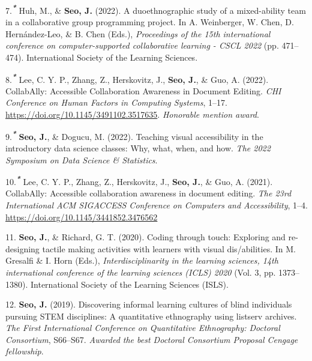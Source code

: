 \documentclass[11pt,a4paper,]{awesome-cv}
\newlength{\cslhangindent}
\newenvironment{CSLReferences}[2] %
 {\begin{list}{}{%
  \setlength{\itemindent}{0pt}
  \setlength{\leftmargin}{0pt}
  \setlength{\parsep}{0pt}
  \ifodd #1
   \setlength{\leftmargin}{\cslhangindent}
   \setlength{\itemindent}{-1\cslhangindent}
  \fi
  \setlength{\itemsep}{#2\baselineskip}}}
 {\end{list}}
\begin{document}
\begin{CSLReferences}{1}{0}
7.\textsuperscript{\textbf{\emph{*}}} Huh, M., \& \textbf{Seo, J.}
(2022). A duoethnographic study of a mixed-ability team in a
collaborative group programming project. In A. Weinberger, W. Chen, D.
Hernández-Leo, \& B. Chen (Eds.), \emph{Proceedings of the 15th
international conference on computer-supported collaborative learning -
CSCL 2022} (pp. 471--474). International Society of the Learning
Sciences.

8.\textsuperscript{\textbf{\emph{*}}} Lee, C. Y. P., Zhang, Z.,
Herskovitz, J., \textbf{Seo, J.}, \& Guo, A. (2022). CollabAlly:
Accessible Collaboration Awareness in Document Editing. \emph{CHI
Conference on Human Factors in Computing Systems}, 1--17.
\url{https://doi.org/10.1145/3491102.3517635}. \emph{Honorable mention
award}.

9.\textsuperscript{\textbf{\emph{*}}} \textbf{Seo, J.}, \& Dogucu, M.
(2022). Teaching visual accessibility in the introductory data science
classes: Why, what, when, and how. \emph{The 2022 Symposium on Data
Science \& Statistics}.

10.\textsuperscript{\textbf{\emph{*}}} Lee, C. Y. P., Zhang, Z.,
Herskovitz, J., \textbf{Seo, J.}, \& Guo, A. (2021). CollabAlly:
Accessible collaboration awareness in document editing. \emph{The 23rd
International ACM SIGACCESS Conference on Computers and Accessibility},
1--4. \url{https://doi.org/10.1145/3441852.3476562}

11. \textbf{Seo, J.}, \& Richard, G. T. (2020). Coding through touch:
Exploring and re-designing tactile making activities with learners with
visual dis/abilities. In M. Gresalfi \& I. Horn (Eds.),
\emph{Interdisciplinarity in the learning sciences, 14th international
conference of the learning sciences (ICLS) 2020} (Vol. 3, pp.
1373--1380). International Society of the Learning Sciences (ISLS).

12. \textbf{Seo, J.} (2019). Discovering informal learning cultures of
blind individuals pursuing STEM disciplines: A quantitative ethnography
using listserv archives. \emph{The First International Conference on
Quantitative Ethnography: Doctoral Consortium}, S66--S67. \emph{Awarded
the best Doctoral Consortium Proposal Cengage fellowship}.


\end{CSLReferences}
\end{document}
